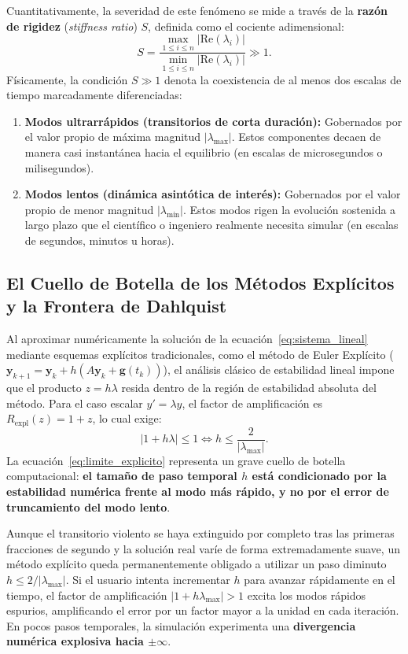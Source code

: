 \documentclass[11pt,a4paper]{article}
\begin{document}
Cuantitativamente, la severidad de este fenómeno se mide a través de la \textbf{razón de rigidez} (\textit{stiffness ratio}) $S$, definida como el cociente adimensional:
\begin{equation}
    S = \frac{\max_{1 \le i \le n} |\text{Re}(\lambda_i)|}{\min_{1 \le i \le n} |\text{Re}(\lambda_i)|} \gg 1.
    \label{eq:stiffness_ratio}
\end{equation}
Físicamente, la condición $S \gg 1$ denota la coexistencia de al menos dos escalas de tiempo marcadamente diferenciadas:
\begin{enumerate}
    \item \textbf{Modos ultrarrápidos (transitorios de corta duración):} Gobernados por el valor propio de máxima magnitud $|\lambda_{\max}|$. Estos componentes decaen de manera casi instantánea hacia el equilibrio (en escalas de microsegundos o milisegundos).
    \item \textbf{Modos lentos (dinámica asintótica de interés):} Gobernados por el valor propio de menor magnitud $|\lambda_{\min}|$. Estos modos rigen la evolución sostenida a largo plazo que el científico o ingeniero realmente necesita simular (en escalas de segundos, minutos u horas).
\end{enumerate}

\subsection{El Cuello de Botella de los Métodos Explícitos y la Frontera de Dahlquist}
Al aproximar numéricamente la solución de la ecuación~\eqref{eq:sistema_lineal} mediante esquemas explícitos tradicionales, como el método de Euler Explícito ($\mathbf{y}_{k+1} = \mathbf{y}_k + h(A\mathbf{y}_k + \mathbf{g}(t_k))$), el análisis clásico de estabilidad lineal impone que el producto $z = h\lambda$ resida dentro de la región de estabilidad absoluta del método. Para el caso escalar $y' = \lambda y$, el factor de amplificación es $R_{\text{expl}}(z) = 1 + z$, lo cual exige:
\begin{equation}
    |1 + h\lambda| \le 1 \iff h \le \frac{2}{|\lambda_{\max}|}.
    \label{eq:limite_explicito}
\end{equation}
La ecuación~\eqref{eq:limite_explicito} representa un grave cuello de botella computacional: \textbf{el tamaño de paso temporal $h$ está condicionado por la estabilidad numérica frente al modo más rápido, y no por el error de truncamiento del modo lento}. 

Aunque el transitorio violento se haya extinguido por completo tras las primeras fracciones de segundo y la solución real varíe de forma extremadamente suave, un método explícito queda permanentemente obligado a utilizar un paso diminuto $h \le 2/|\lambda_{\max}|$. Si el usuario intenta incrementar $h$ para avanzar rápidamente en el tiempo, el factor de amplificación $|1 + h\lambda_{\max}| > 1$ excita los modos rápidos espurios, amplificando el error por un factor mayor a la unidad en cada iteración. En pocos pasos temporales, la simulación experimenta una \textbf{divergencia numérica explosiva hacia $\pm \infty$}.
\end{document}
